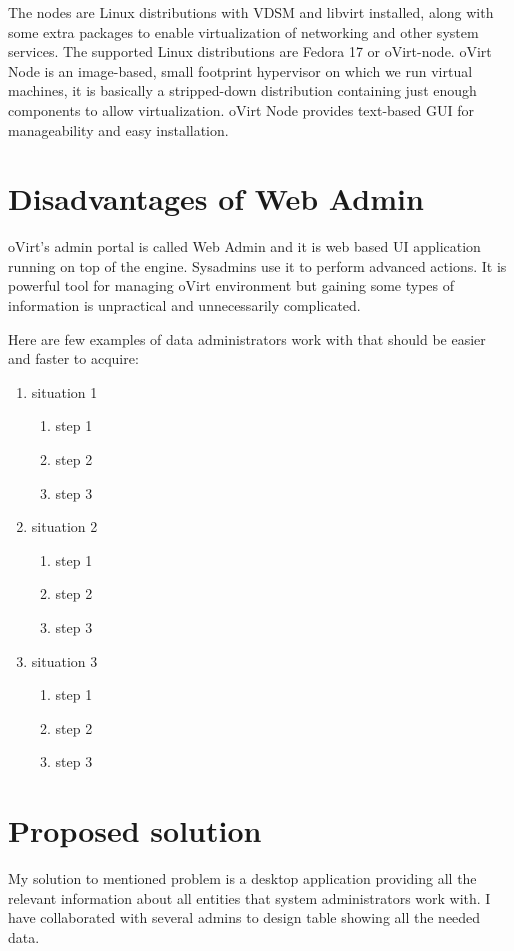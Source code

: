 The nodes are Linux distributions with VDSM and libvirt installed, along with some extra packages to enable virtualization of networking and other system services. The supported Linux distributions are Fedora 17 or oVirt-node. oVirt Node is an image-based, small footprint hypervisor on which we run virtual machines, it is basically a stripped-down distribution containing just enough components to allow virtualization. oVirt Node provides text-based GUI for manageability and easy installation.

\section{Disadvantages of Web Admin}
oVirt's admin portal is called Web Admin and it is web based UI application running on top of the engine. Sysadmins use it to perform advanced actions. It is powerful tool for managing oVirt environment but gaining some types of information is unpractical and unnecessarily complicated.

Here are few examples of data administrators work with that should be easier and faster to acquire:
\begin{enumerate}
\item situation 1
\begin{enumerate}
\item step 1
\item step 2
\item step 3
\end{enumerate}
\item situation 2
\begin{enumerate}
\item step 1
\item step 2
\item step 3
\end{enumerate}
\item situation 3
\begin{enumerate}
\item step 1
\item step 2
\item step 3
\end{enumerate}
\end{enumerate}

\section{Proposed solution}
My solution to mentioned problem is a desktop application providing all the relevant information about all entities that system administrators work with. I have collaborated with several admins to design table showing all the needed data.

